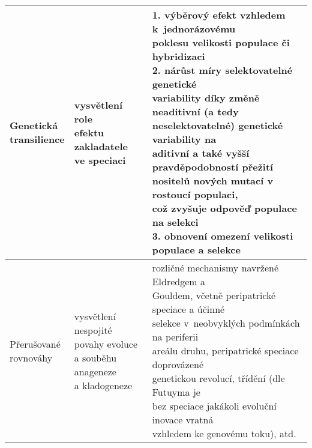 \begin{longtable}{| l | l | l |}
\makecell[l]{Genetická \\ transilience} &
\makecell[l]{vysvětlení role \\ efektu zakladatele \\ ve speciaci}   &
\makecell[l]{
1. výběrový efekt vzhledem k jednorázovému \\
poklesu velikosti populace či hybridizaci \\
2. nárůst míry selektovatelné genetické \\
variability díky změně neaditivní (a tedy \\
neselektovatelné) genetické variability na \\
aditivní a také vyšší pravděpodobností přežití \\
nositelů nových  mutací v rostoucí populaci, \\
což zvyšuje odpověď populace na selekci \\
3. obnovení omezení  velikosti populace a  selekce
}\\

\hline

\makecell[l]{Přerušované \\ rovnováhy} &
\makecell[l]{vysvětlení nespojité \\ povahy evoluce \\ a souběhu anageneze \\ a kladogeneze}   &
\makecell[l]{
rozličné mechanismy navržené Eldredgem a \\
Gouldem, včetně peripatrické speciace a účinné \\
selekce v neobvyklých podmínkách na periferii \\
areálu druhu, peripatrické speciace doprovázené \\
genetickou revolucí, třídění (dle Futuyma je \\
bez speciace jakákoli evoluční inovace vratná \\
vzhledem ke genovému toku), atd.
}\\
\hline


\end{longtable}
